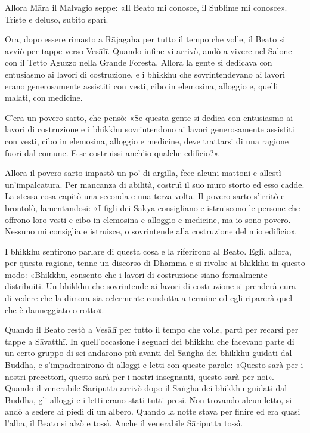 Allora Māra il Malvagio seppe: «Il Beato mi conosce, il Sublime mi conosce».
Triste e deluso, subito sparì.


 Ora, dopo essere rimasto a Rājagaha per tutto il tempo che
volle, il Beato si avviò per tappe verso Vesālī. Quando infine vi arrivò, andò a
vivere nel Salone con il Tetto Aguzzo nella Grande Foresta. Allora la gente si
dedicava con entusiasmo ai lavori di costruzione, e i bhikkhu che
sovrintendevano ai lavori erano generosamente assistiti con vesti, cibo in
elemosina, alloggio e, quelli malati, con medicine.

C’era un povero sarto, che pensò: «Se questa gente si dedica con entusiasmo ai
lavori di costruzione e i bhikkhu sovrintendono ai lavori generosamente
assistiti con vesti, cibo in elemosina, alloggio e medicine, deve trattarsi di
una ragione fuori dal comune. E se costruissi anch’io qualche edificio?».

Allora il povero sarto impastò un po’ di argilla, fece alcuni mattoni e allestì
un’impalcatura. Per mancanza di abilità, costruì il suo muro storto ed esso
cadde. La stessa cosa capitò una seconda e una terza volta. Il povero sarto
s’irritò e brontolò, lamentandosi: «I figli dei Sakya consigliano e istruiscono
le persone che offrono loro vesti e cibo in elemosina e alloggio e medicine, ma
io sono povero. Nessuno mi consiglia e istruisce, o sovrintende alla costruzione
del mio edificio».

I bhikkhu sentirono parlare di questa cosa e la riferirono al Beato. Egli,
allora, per questa ragione, tenne un discorso di Dhamma e si rivolse ai bhikkhu
in questo modo: «Bhikkhu, consento che i lavori di costruzione siano formalmente
distribuiti. Un bhikkhu che sovrintende ai lavori di costruzione si prenderà
cura di vedere che la dimora sia celermente condotta a termine ed egli riparerà
quel che è danneggiato o rotto».

Quando il Beato restò a Vesālī per tutto il tempo che volle, partì per recarsi
per tappe a Sāvatthī. In quell’occasione i seguaci dei bhikkhu che facevano
parte di un certo gruppo di sei andarono più avanti del Saṅgha dei bhikkhu
guidati dal Buddha, e s’impadronirono di alloggi e letti con queste parole:
«Questo sarà per i nostri precettori, questo sarà per i nostri insegnanti,
questo sarà per noi». Quando il venerabile Sāriputta arrivò dopo il Saṅgha dei
bhikkhu guidati dal Buddha, gli alloggi e i letti erano stati tutti presi. Non
trovando alcun letto, si andò a sedere ai piedi di un albero. Quando la notte
stava per finire ed era quasi l’alba, il Beato si alzò e tossì. Anche il
venerabile Sāriputta tossì.

